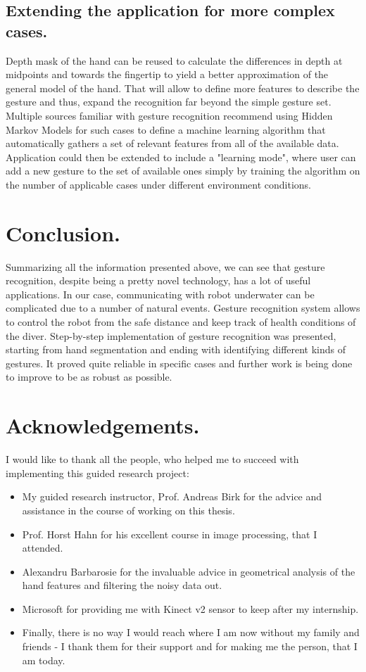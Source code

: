\documentclass[a4paper,11pt,oneside]{article}
\begin{document}
\subsection{Extending the application for more complex cases.}
Depth mask of the hand can be reused to calculate the differences in depth at midpoints and towards the fingertip to yield a better approximation of the general model of the hand. That will allow to define more features to describe the gesture and thus, expand the recognition far beyond the simple gesture set. Multiple sources familiar with gesture recognition recommend using Hidden Markov Models for such cases to define a machine learning algorithm that automatically gathers a set of relevant features from all of the available data. Application could then be extended to include a "learning mode", where user can add a new gesture to the set of available ones simply by training the algorithm on the number of applicable cases under different environment conditions.
  
 \section{Conclusion.}

 Summarizing all the information presented above, we can see that gesture recognition, despite being a pretty novel technology, has a lot of useful applications. In our case, communicating with robot underwater can be complicated due to a number of natural events. Gesture recognition system allows to control the robot from the safe distance and keep track of health conditions of the diver. Step-by-step implementation of gesture recognition was presented, starting from hand segmentation and ending with identifying different kinds of gestures. It proved quite reliable in specific cases and further work is being done to improve to be as robust as possible.  

  \section{Acknowledgements.}
I would like to thank all the people, who helped me to succeed with implementing this guided research project:

\begin{itemize}
\item My guided research instructor, Prof. Andreas Birk for the advice and assistance in the course of working on this thesis.
\item Prof. Horst Hahn for his excellent course in image processing, that I attended.
\item Alexandru Barbarosie for the invaluable advice in geometrical analysis of the hand features and filtering the noisy data out. 
\item Microsoft for providing me with Kinect v2 sensor to keep after my internship. 
\item Finally, there is no way I would reach where I am now without my family and friends - I thank them for their support and for making me the person, that I am today.
\end{itemize}
\end{document}
